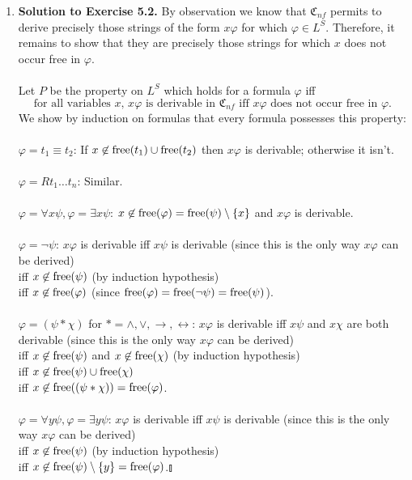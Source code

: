 \begin{enumerate}[1.]
\item \textbf{Solution to Exercise 5.2.} By observation we know that $\mathfrak{C}_{nf}$ permits to derive precisely those strings of the form $x \varphi$ for which $\varphi \in L^S$. Therefore, it remains to show that they are precisely those strings for which $x$ does not occur free in $\varphi$. \\
\ 
\\Let $P$ be the property on $L^S$ which holds for a formula $\varphi$ iff
\[
\mbox{for all variables $x$, } x \varphi \mbox{ is derivable in } \mathfrak{C}_{nf} \mbox{ iff } x \varphi \mbox{ does not occur free in } \varphi.
\]
We show by induction on formulas that every formula possesses this property:\\
\ 
\\$\varphi = t_1 \equiv t_2$: If $x \not \in \mathrm{free}(t_1) \cup \mathrm{free}(t_2)$ then $x \varphi$ is derivable; otherwise it isn't.\\
\ 
\\$\varphi = Rt_1 \ldots t_n$: Similar.\\
\ 
\\$\varphi = \forall x \psi, \varphi = \exists x \psi$: $x \not \in \mathrm{free}(\varphi) = \mathrm{free}(\psi) \setminus \{ x \}$ and $x \varphi$ is derivable.\\
\ 
\\$\varphi = \neg \psi$: $x \varphi$ is derivable iff $x \psi$ is derivable (since this is the only way $x \varphi$ can be derived)
\\iff $x \not \in \mathrm{free}(\psi)$ (by induction hypothesis)
\\iff $x \not \in \mathrm{free}(\varphi)$ (since $\mathrm{free}(\varphi) = \mathrm{free}(\neg \psi) = \mathrm{free}(\psi)$). \\
\ 
\\$\varphi = (\psi \ast \chi)$ for $\ast = \land, \lor, \rightarrow, \leftrightarrow$: $x \varphi$ is derivable iff $x \psi$ and $x \chi$ are both derivable (since this is the only way $x \varphi$ can be derived)
\\iff $x \not \in \mathrm{free}(\psi)$ and $x \not \in \mathrm{free}(\chi)$ (by induction hypothesis)
\\iff $x \not \in \mathrm{free}(\psi) \cup \mathrm{free}(\chi)$
\\iff $x \not \in \mathrm{free}((\psi \ast \chi)) = \mathrm{free}(\varphi)$. \\
\ 
\\$\varphi = \forall y \psi, \varphi = \exists y \psi$: $x \varphi$ is derivable iff $x \psi$ is derivable (since this is the only way $x \varphi$ can be derived)
\\iff $x \not \in \mathrm{free}(\psi)$ (by induction hypothesis)
\\iff $x \not \in \mathrm{free}(\psi) \setminus \{ y \} = \mathrm{free}(\varphi)$.\nolinebreak\hfill$\talloblong$
\end{enumerate}
